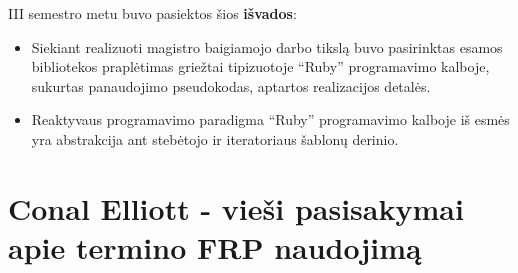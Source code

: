 \documentclass{VUMIFPSmagistrinis}
\begin{document}
III semestro metu buvo pasiektos šios \textbf{išvados}:

\begin{itemize}
  \item Siekiant realizuoti magistro baigiamojo darbo tikslą buvo pasirinktas esamos bibliotekos praplėtimas griežtai tipizuotoje ``Ruby'' programavimo kalboje, sukurtas panaudojimo pseudokodas, aptartos realizacijos detalės.
  \item Reaktyvaus programavimo paradigma ``Ruby'' programavimo kalboje iš esmės yra abstrakcija ant stebėtojo ir iteratoriaus šablonų derinio.


\end{itemize}

\printbibliography[heading=bibintoc]  %





\appendix  %

\section{Conal Elliott - vieši pasisakymai apie termino FRP naudojimą}
\end{document}
